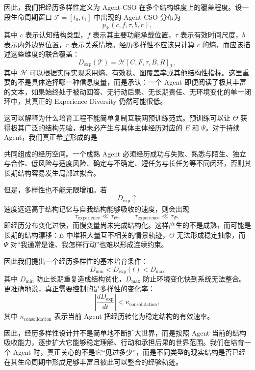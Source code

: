 因此，我们把经历多样性定义为 Agent-CSO 在多个结构维度上的覆盖程度。设一段生命周期窗口 $\mathcal T=[t_0,t_1]$ 中出现的 Agent-CSO 分布为
\[
p_{\mathcal T}(c,f,\tau,b,r),
\]
其中 $c$ 表示认知结构类型，$f$ 表示其主要功能承载位置，$\tau$ 表示有效时间尺度，$b$ 表示内外边界位置，$r$ 表示关系情境。经历多样性不应该只计算 $c$ 的熵，而应该描述这些维度的联合覆盖：
\[
D_{\mathrm{exp}}(\mathcal T)
=
\mathcal H
\left[
C,F,\tau,B,R
\right]_{\mathcal T},
\]
其中 $\mathcal H$ 可以根据实际实现采用熵、有效秩、图覆盖率或其他结构性指标。这里重要的不是具体选择哪一种信息度量，而是承认：一个 Agent 即便阅读了极其丰富的文本，如果始终处于被动回答、无行动后果、无长期责任、无环境变化的单一闭环中，其真正的 Experience Diversity 仍然可能很低。

这可以解释为什么培育工程不能简单复制互联网预训练范式。预训练可以让 $\Theta$ 获得极其广泛的结构先验，却未必产生与具体主体经历对应的 $E$ 和 $\Psi$。对于持续 Agent，我们真正希望形成的是
\begin{statementbox}
\centering
{}
\end{statementbox}
共同组成的经历空间。一个成熟 Agent 必须经历成功与失败、熟悉与陌生、独立与合作、低风险与适度风险、确定与不确定、短任务与长任务等不同闭环，否则其长期结构容易发生局部过拟合。

但是，多样性也不能无限增加。若
\[
D_{\mathrm{exp}}\uparrow
\]
速度远远高于结构记忆与自我结构能够吸收的速度，则会出现
\[
\tau_{\mathrm{experience}}
\ll
\tau_{\Theta},
\qquad
\tau_{\mathrm{experience}}
\ll
\tau_{\Psi},
\]
即经历分布变化过快，而慢变量尚未完成结构化。这样产生的不是成熟，而可能是长期的结构漂移：$E$ 中堆积大量互不相关的情景轨迹，$\Theta$ 无法形成稳定抽象，而 $\Psi$ 对“我通常是谁、我怎样行动”也难以形成连续约束。

因此我们提出一个经历多样性的基本培育条件：
\[
\boxed{
D_{\min}
<
D_{\mathrm{exp}}(t)
<
D_{\max}
}
\]
其中 $D_{\min}$ 防止长期重复造成结构贫化，$D_{\max}$ 防止环境变化快到系统无法整合。更准确地说，真正需要控制的是多样性的变化率：
\[
\left|
\frac{dD_{\mathrm{exp}}}{dt}
\right|
<
\kappa_{\mathrm{consolidation}},
\]
其中 $\kappa_{\mathrm{consolidation}}$ 表示当前 Agent 把经历转化为稳定结构的有效速率。

因此，经历多样性设计并不是简单地不断扩大世界，而是按照 Agent 当前的结构吸收能力，逐步扩大它能够稳定理解、行动和承担后果的世界范围。我们在培育一个 Agent 时，真正关心的不是它“见过多少”，而是不同类型的现实结构是否已经在其生命周期中形成足够丰富且彼此可以整合的经验轨迹。

